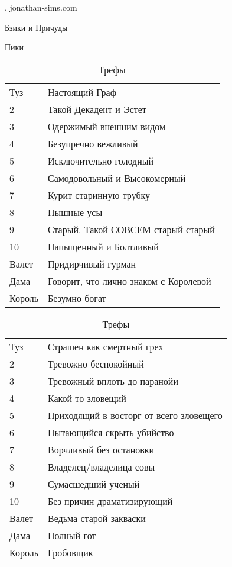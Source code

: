 \documentclass[twoside,twocolumn]{article}
\begin{document}
\begin{thebibliography}{99} %

,
\newblock jonathan-sims.com 

\end{thebibliography}


\pagebreak

\begin{table}[!htb]
    \caption{Бзики и Причуды}
    \begin{minipage}{.5\linewidth}
      \caption*{Пики}
      \centering
        \begin{tabular}{ll}
            Туз & Настоящий Граф\\
2 & Такой Декадент и Эстет\\
3 & Одержимый внешним видом\\
4 & Безупречно вежливый\\
5 & Исключительно голодный\\
6 & Самодовольный и Высокомерный\\
7 & Курит старинную трубку\\
8 & Пышные усы\\
9 & Старый. Такой СОВСЕМ старый-старый\\
10 & Напыщенный и Болтливый\\
Валет & Придирчивый гурман\\
Дама & Говорит, что лично знаком с Королевой\\
Король & Безумно богат
        \end{tabular}
    \end{minipage}%
\begin{minipage}{2.7\linewidth}
      \centering
        \caption*{Трефы}
        \begin{tabular}{ll}
Туз & Страшен как смертный грех\\
2 & Тревожно беспокойный\\
3 & Тревожный вплоть до паранойи\\
4 & Какой-то зловещий\\
5 & Приходящий в восторг от всего зловещего\\
6 & Пытающийся скрыть убийство\\
7 & Ворчливый без остановки\\
8 & Владелец/владелица совы\\
9 & Сумасшедший ученый\\
10 & Без причин драматизирующий\\
Валет & Ведьма старой закваски\\
Дама & Полный гот\\
Король & Гробовщик\\
        \end{tabular}
   \end{minipage}
\hfill   
\vfill
\vfill
\hfill


\end{table}
\end{document}
